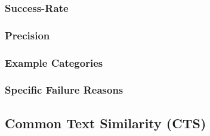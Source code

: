 \documentclass[\myrootdir/main.tex]{subfiles}
\begin{document}
\subsubsection{Success-Rate}
\subsubsection{Precision}
\subsubsection{Example Categories}
\subsubsection{Specific Failure Reasons}


\subsection{Common Text Similarity (CTS)}
\end{document}
